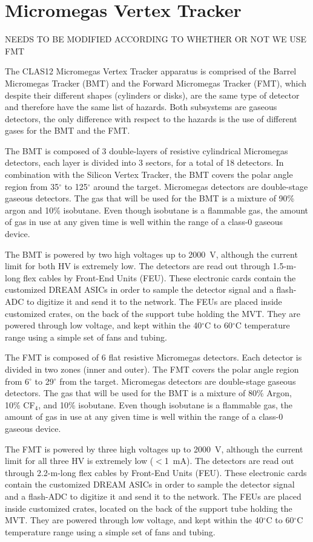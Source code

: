 \section{Micromegas Vertex Tracker}

NEEDS TO BE MODIFIED ACCORDING TO WHETHER OR NOT WE USE FMT

The CLAS12 Micromegas Vertex Tracker apparatus is comprised of the Barrel Micromegas 
Tracker (BMT) and the Forward Micromegas Tracker (FMT), which despite their different 
shapes (cylinders or disks), are the same type of detector and therefore have the same 
list of hazards. Both subsystems are gaseous detectors, the only difference with respect 
to the hazards is the use of different gases for the BMT and the FMT.

The BMT is composed of 3 double-layers of resistive cylindrical Micromegas detectors, each 
layer is divided into 3 sectors, for a total of 18 detectors. In combination with the 
Silicon Vertex Tracker, the BMT covers the polar angle region from 35$^\circ$ to 125$^\circ$ 
around the target. Micromegas detectors are double-stage gaseous detectors. The gas that will 
be used for the BMT is a mixture of 90\% argon and 10\% isobutane. Even though isobutane 
is a flammable gas, the amount of gas in use at any given time is well within the range of a 
class-0 gaseous device.

The BMT is powered by two high voltages up to 2000~V, although the current limit for both 
HV is extremely low. The detectors are read out through 1.5-m-long flex cables by Front-End 
Units (FEU). These electronic cards contain the customized DREAM ASICs in order to sample the 
detector signal and a flash-ADC to digitize it and send it to the network. The FEUs are placed 
inside customized crates, on the back of the support tube holding the MVT. They are powered 
through low voltage, and kept within the 40$^\circ$C to 60$^\circ$C temperature range using a 
simple set of fans and tubing.

The FMT is composed of 6 flat resistive Micromegas detectors. Each detector is divided in two 
zones (inner and outer). The FMT covers the polar angle region from 6$^\circ$ to 29$^\circ$ 
from the target. Micromegas detectors are double-stage gaseous detectors. The gas that will be 
used for the BMT is a mixture of 80\% Argon, 10\% CF$_4$, and 10\% isobutane. Even though 
isobutane is a flammable gas, the amount of gas in use at any given time is well within the 
range of a class-0 gaseous device.

The FMT is powered by three high voltages up to 2000~V, although the current limit for all 
three HV is extremely low ($<$1~mA). The detectors are read out through 2.2-m-long flex cables 
by Front-End Units (FEU). These electronic cards contain the customized DREAM ASICs in order to 
sample the detector signal and a flash-ADC to digitize it and send it to the network. The FEUs 
are placed inside customized crates, located on the back of the support tube holding the MVT. 
They are powered through low voltage, and kept within the 40$^\circ$C to 60$^\circ$C temperature 
range using a simple set of fans and tubing.

